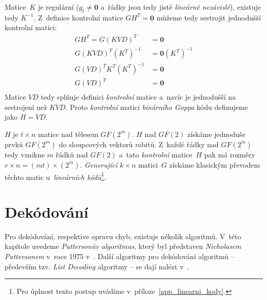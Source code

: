 \documentclass[thesis=M,czech,hidelinks]{FITthesis}[2012/06/26]
\newcommand{\0}{{\textcolor[gray]{0.75}{0}}}
\begin{document}
Matice~$K$ je regulární ($g_t \neq \mathbf{0}$ a~řádky jsou tedy jistě
\emph{lineárně nezávislé}), existuje tedy $K^{-1}$. Z~definice kontrolní matice
$GH^T = \mathbf{0}$ můžeme tedy sestrojit jednodušší kontrolní matici:
\begin{align*}
    G H^T = G (KVD)^T                   &= \mathbf{0} \\
    G (KVD)^T\left(K^T\right)^{-1}      &= \mathbf{0} \left(K^T\right)^{-1} \\
    G (VD)^T K^T \left(K^T\right)^{-1}  &= \mathbf{0} \\
    G (VD)^T                            &= \mathbf{0} \\
\end{align*}
Matice $VD$ tedy splňuje definici \emph{kontrolní} matice a~navíc je jednodušší
na sestrojení než $KVD$. Proto \emph{kontrolní} matici \emph{binárního Goppa}
kódu definujeme jako $H=VD$.

$H$ je $t \times n$ matice nad tělesem $GF(2^m)$. $H$ nad $GF(2)$ získáme
jednoduše  prvků $GF(2^m)$ do sloupcových vektorů $m$\;bitů.
Z~každé řádky nad $GF(2^m)$ tedy vznikne $m$ řádků nad $GF(2)$ a~tato
\emph{kontrolní} matice~$H$ pak má rozměry $r \times n = (mt) \times (2^m)$.
\emph{Generující} $k \times n$ matici~$G$ získáme klasickým převodem těchto
matic u~\emph{lineárních kódů}\footnote{
    Pro úplnost tento postup uvádíme v~příloze~\ref{app_linearni_kody}.
}.






\section{Dekódování}\label{kap_goppa_dekodovani}

Pro dekódování, respektive opravu chyb, existuje několik algoritmů. V~této
kapitole uvedeme \emph{Pattersonův algoritmus}, který byl představen
\emph{Nicholasem Pattersonem} v~roce 1975 v~\cite{Patterson}. Další algoritmy
pro dekódování algoritmů -- především tzv. \emph{List Decoding} algoritmy -- se
dají nalézt v~\cite{Repka,Bernstein2}.
\end{document}
